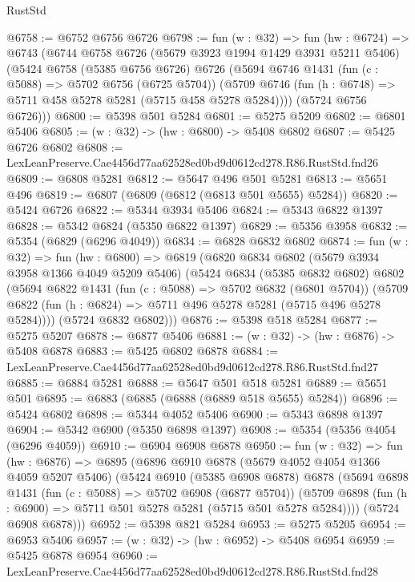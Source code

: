 \begin{lexlean}{RustStd}
\begin{coremodule}
@6758 := @6752 @6756 @6726
@6798 := fun (w : @32) =>
  fun (hw : @6724) =>
  @6743
    (@6744
      @6758
      @6726
      (@5679 @3923 @1994 @1429 @3931 @5211 @5406)
      (@5424
        @6758
        (@5385 @6756 @6726)
        @6726
        (@5694
          @6746
          @1431
          (fun (c : @5088) => @5702 @6756 (@6725 @5704))
          (@5709 @6746 (fun (h : @6748) => @5711 @458 @5278 @5281 (@5715 @458 @5278 @5284))))
        (@5724 @6756 @6726)))
@6800 := @5398 @501 @5284
@6801 := @5275 @5209
@6802 := @6801 @5406
@6805 := (w : @32) -> (hw : @6800) -> @5408 @6802
@6807 := @5425 @6726 @6802
@6808 := LexLeanPreserve.Cae4456d77aa62528ed0bd9d0612cd278.R86.RustStd.fnd26
@6809 := @6808 @5281
@6812 := @5647 @496 @501 @5281
@6813 := @5651 @496
@6819 := @6807 (@6809 (@6812 (@6813 @501 @5655) @5284))
@6820 := @5424 @6726
@6822 := @5344 @3934 @5406
@6824 := @5343 @6822 @1397
@6828 := @5342 @6824 (@5350 @6822 @1397)
@6829 := @5356 @3958
@6832 := @5354 (@6829 (@6296 @4049))
@6834 := @6828 @6832 @6802
@6874 := fun (w : @32) =>
  fun (hw : @6800) =>
  @6819
    (@6820
      @6834
      @6802
      (@5679 @3934 @3958 @1366 @4049 @5209 @5406)
      (@5424
        @6834
        (@5385 @6832 @6802)
        @6802
        (@5694
          @6822
          @1431
          (fun (c : @5088) => @5702 @6832 (@6801 @5704))
          (@5709 @6822 (fun (h : @6824) => @5711 @496 @5278 @5281 (@5715 @496 @5278 @5284))))
        (@5724 @6832 @6802)))
@6876 := @5398 @518 @5284
@6877 := @5275 @5207
@6878 := @6877 @5406
@6881 := (w : @32) -> (hw : @6876) -> @5408 @6878
@6883 := @5425 @6802 @6878
@6884 := LexLeanPreserve.Cae4456d77aa62528ed0bd9d0612cd278.R86.RustStd.fnd27
@6885 := @6884 @5281
@6888 := @5647 @501 @518 @5281
@6889 := @5651 @501
@6895 := @6883 (@6885 (@6888 (@6889 @518 @5655) @5284))
@6896 := @5424 @6802
@6898 := @5344 @4052 @5406
@6900 := @5343 @6898 @1397
@6904 := @5342 @6900 (@5350 @6898 @1397)
@6908 := @5354 (@5356 @4054 (@6296 @4059))
@6910 := @6904 @6908 @6878
@6950 := fun (w : @32) =>
  fun (hw : @6876) =>
  @6895
    (@6896
      @6910
      @6878
      (@5679 @4052 @4054 @1366 @4059 @5207 @5406)
      (@5424
        @6910
        (@5385 @6908 @6878)
        @6878
        (@5694
          @6898
          @1431
          (fun (c : @5088) => @5702 @6908 (@6877 @5704))
          (@5709 @6898 (fun (h : @6900) => @5711 @501 @5278 @5281 (@5715 @501 @5278 @5284))))
        (@5724 @6908 @6878)))
@6952 := @5398 @821 @5284
@6953 := @5275 @5205
@6954 := @6953 @5406
@6957 := (w : @32) -> (hw : @6952) -> @5408 @6954
@6959 := @5425 @6878 @6954
@6960 := LexLeanPreserve.Cae4456d77aa62528ed0bd9d0612cd278.R86.RustStd.fnd28

\end{coremodule}
\end{lexlean}
